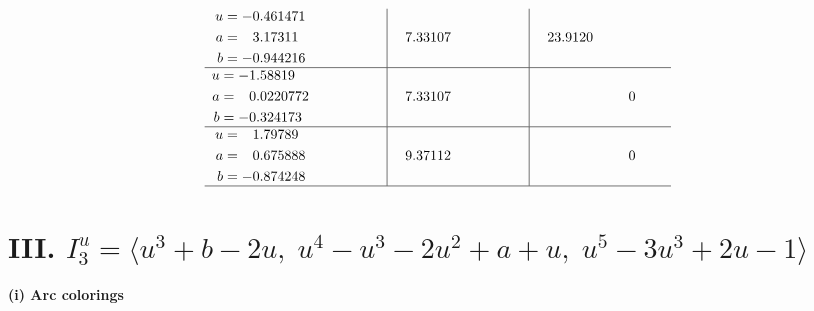 \documentclass[1p]{elsarticle_modified}
\theoremstyle{definition}
\begin{document}
$$\begin{array}{c|c|c}
\begin{aligned}
u &= -0.461471\phantom{ +0.000000I} \\
a &= \phantom{-}3.17311\phantom{ +0.000000I} \\
b &= -0.944216\phantom{ +0.000000I}\end{aligned}
 & \phantom{-}7.33107\phantom{ +0.000000I} & \phantom{-}23.9120\phantom{ +0.000000I} \\ \hline\begin{aligned}
u &= -1.58819\phantom{ +0.000000I} \\
a &= \phantom{-}0.0220772\phantom{ +0.000000I} \\
b &= -0.324173\phantom{ +0.000000I}\end{aligned}
 & \phantom{-}7.33107\phantom{ +0.000000I} & \phantom{-0.000000 } 0 \\ \hline\begin{aligned}
u &= \phantom{-}1.79789\phantom{ +0.000000I} \\
a &= \phantom{-}0.675888\phantom{ +0.000000I} \\
b &= -0.874248\phantom{ +0.000000I}\end{aligned}
 & \phantom{-}9.37112\phantom{ +0.000000I} & \phantom{-0.000000 } 0\\
 \hline 
 \end{array}$$\newpage\newpage\renewcommand{\arraystretch}{1}
\centering \section*{III. $I^u_{3}= \langle u^3+b-2 u,\;u^4- u^3-2 u^2+a+u,\;u^5-3 u^3+2 u-1 \rangle$}
\flushleft \textbf{(i) Arc colorings}\\
\end{document}
